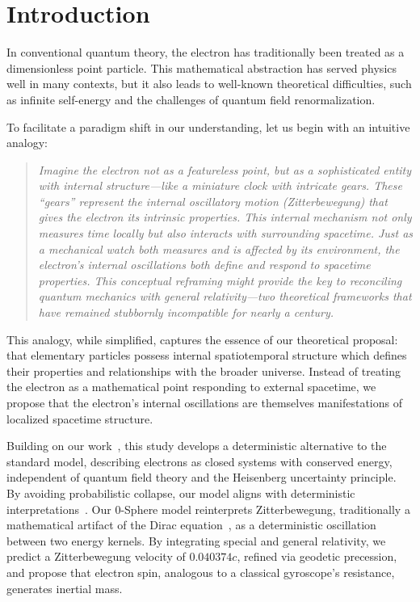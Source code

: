 \documentclass[%
 reprint,
 amsmath,amssymb,
 aps,
]{revtex4-1}
\numberwithin{equation}{section}%
\begin{document}
\section{Introduction}

In conventional quantum theory, the electron has traditionally been treated as a dimensionless point particle. This mathematical abstraction has served physics well in many contexts, but it also leads to well-known theoretical difficulties, such as infinite self-energy and the challenges of quantum field renormalization.

To facilitate a paradigm shift in our understanding, let us begin with an intuitive analogy:

\begin{quote}
\textit{Imagine the electron not as a featureless point, but as a sophisticated entity with internal structure—like a miniature clock with intricate gears. These ``gears'' represent the internal oscillatory motion (Zitterbewegung) that gives the electron its intrinsic properties. This internal mechanism not only measures time locally but also interacts with surrounding spacetime. Just as a mechanical watch both measures and is affected by its environment, the electron's internal oscillations both define and respond to spacetime properties. This conceptual reframing might provide the key to reconciling quantum mechanics with general relativity—two theoretical frameworks that have remained stubbornly incompatible for nearly a century.}
\end{quote}

This analogy, while simplified, captures the essence of our theoretical proposal: that elementary particles possess internal spatiotemporal structure which defines their properties and relationships with the broader universe. Instead of treating the electron as a mathematical point responding to external spacetime, we propose that the electron's internal oscillations are themselves manifestations of localized spacetime structure.

Building on our work~\cite{hanamura2023}, this study develops a deterministic alternative to the standard model, describing electrons as closed systems with conserved energy, independent of quantum field theory and the Heisenberg uncertainty principle. By avoiding probabilistic collapse, our model aligns with deterministic interpretations~\cite{bohm1952}. Our 0-Sphere model reinterprets Zitterbewegung, traditionally a mathematical artifact of the Dirac equation~\cite{schrodinger1930}, as a deterministic oscillation between two energy kernels. By integrating special and general relativity, we predict a Zitterbewegung velocity of $0.040374c$, refined via geodetic precession, and propose that electron spin, analogous to a classical gyroscope's resistance, generates inertial mass.
\end{document}
